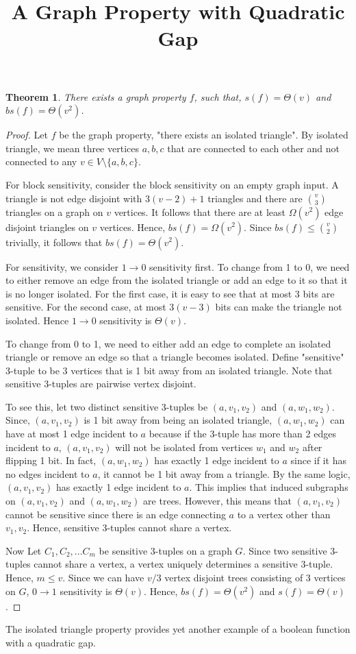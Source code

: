 \documentclass[psamsfonts]{amsart}
\title{A Graph Property with Quadratic Gap}
\newtheorem{thm}{Theorem}[section]
\theoremstyle{definition}
\theoremstyle{remark}
\numberwithin{equation}{section}
\begin{document}
\maketitle

\begin{thm}
There exists a graph property $f$, such that, $s(f) = \Theta(v)$ and $bs(f) = \Theta(v^2)$.
\end{thm} 

\begin{proof}
Let $f$ be the graph property, "there exists an isolated triangle". By isolated triangle, we mean three vertices $a,b,c$ that are connected to each other and not connected to any $v \in V\setminus\{a,b,c\}$.

For block sensitivity, consider the block sensitivity on an empty graph input. A triangle is not edge disjoint with $3(v-2)+1$ triangles and there are ${v \choose 3}$ triangles on a graph on $v$ vertices. It follows that there are at least $\Omega(v^2)$ edge disjoint triangles on $v$ vertices. Hence, $bs(f) = \Omega(v^2)$. Since $bs(f) \leq {v \choose 2}$ trivially, it follows that $bs(f) = \Theta(v^2)$.

For sensitivity, we consider $1 \rightarrow 0$ sensitivity first. To change from 1 to 0, we need to either remove an edge from the isolated triangle or add an edge to it so that it is no longer isolated. For the first case, it is easy to see that at most 3 bits are sensitive. For the second case, at most $3(v-3)$ bits can make the triangle not isolated. Hence $1 \rightarrow 0$ sensitivity is $\Theta(v)$.

To change from 0 to 1, we need to either add an edge to complete an isolated triangle or remove an edge so that a triangle becomes isolated. Define "sensitive" 3-tuple to be 3 vertices that is 1 bit away from an isolated triangle. Note that sensitive 3-tuples are pairwise vertex disjoint. 

To see this, let two distinct sensitive 3-tuples be $(a,v_1,v_2)$ and $(a,w_1,w_2)$. Since, $(a,v_1,v_2)$ is 1 bit away from being an isolated triangle, $(a,w_1,w_2)$ can have at most 1 edge incident to $a$ because if the 3-tuple has more than 2 edges incident to $a$, $(a,v_1,v_2)$ will not be isolated from vertices $w_1$ and $w_2$ after flipping 1 bit. In fact, $(a,w_1,w_2)$ has exactly 1 edge incident to $a$ since if it has no edges incident to $a$, it cannot be 1 bit away from a triangle. By the same logic, $(a,v_1,v_2)$ has exactly 1 edge incident to $a$. This implies that induced subgraphs on $(a,v_1,v_2)$ and $(a,w_1,w_2)$ are trees. However, this means that $(a,v_1,v_2)$ cannot be sensitive since there is an edge connecting $a$ to a vertex other than $v_1,v_2$. Hence, sensitive 3-tuples cannot share a vertex. 

Now Let $C_1, C_2, ... C_m$ be sensitive 3-tuples on a graph $G$. Since two sensitive 3-tuples cannot share a vertex, a vertex uniquely determines a sensitive 3-tuple. Hence, $m \leq v$. Since we can have $v/3$ vertex disjoint trees consisting of 3 vertices on $G$, $0 \rightarrow 1$ sensitivity is $\Theta(v)$.  
Hence, $bs(f) = \Theta(v^2)$ and $s(f) = \Theta(v)$.
\end{proof}

The isolated triangle property provides yet another example of a boolean function with a quadratic gap.
\end{document}
